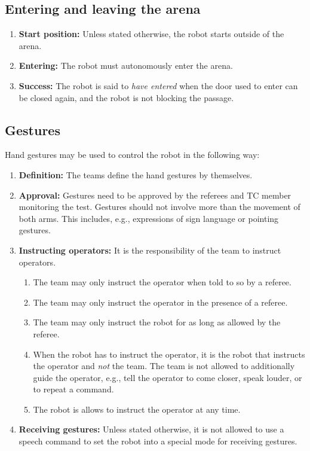 \subsection{Entering and leaving the arena}
\label{rule:start_position}
\begin{enumerate}
	\item \textbf{Start position:} Unless stated otherwise, the robot starts outside of the arena.
	\item \textbf{Entering:} The robot must autonomously enter the arena.
	\item \textbf{Success:} The robot is said to \emph{have entered} when the door used to enter can be closed again, and the robot is not blocking the passage.
\end{enumerate}



\subsection{Gestures}
\label{rule:gestures}
Hand gestures may be used to control the robot in the following way:
\begin{enumerate}
	\item \textbf{Definition:} The teams define the hand gestures by themselves.

	\item \textbf{Approval:} Gestures need to be approved by the referees and TC member monitoring the test. Gestures should not involve more than the movement of both arms. This includes, e.g., expressions of sign language or pointing gestures.

	\item \textbf{Instructing operators:} It is the responsibility of the team to instruct operators.
	\begin{enumerate}
		\item The team may only instruct the operator when told to so by a referee.
		\item The team may only instruct the operator in the presence of a referee.
		\item The team may only instruct the robot for as long as allowed by the referee.
		\item When the robot has to instruct the operator, it is the robot that instructs the operator and \emph{not} the team. The team is not allowed to additionally guide the operator, e.g., tell the operator to come closer, speak louder, or to repeat a command.
		\item The robot is allows to instruct the operator at any time.
	\end{enumerate}

	\item \textbf{Receiving gestures:} Unless stated otherwise, it is not allowed to use a speech command to set the robot into a special mode for receiving gestures.
\end{enumerate}



